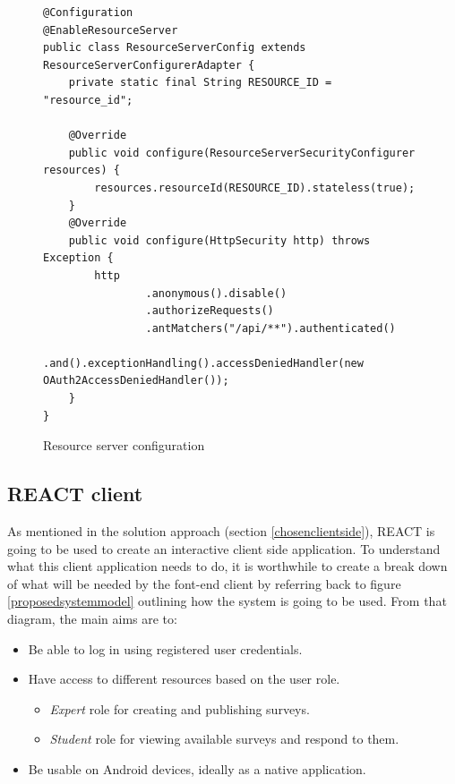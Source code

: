 \begin{figure}[ht]
    \centering
    \begin{lstlisting}
@Configuration
@EnableResourceServer
public class ResourceServerConfig extends ResourceServerConfigurerAdapter {
    private static final String RESOURCE_ID = "resource_id";

    @Override
    public void configure(ResourceServerSecurityConfigurer resources) {
        resources.resourceId(RESOURCE_ID).stateless(true);
    }
    @Override
    public void configure(HttpSecurity http) throws Exception {
        http
                .anonymous().disable()
                .authorizeRequests()
                .antMatchers("/api/**").authenticated()
                .and().exceptionHandling().accessDeniedHandler(new OAuth2AccessDeniedHandler());
    } 
}
    \end{lstlisting}
    \caption{Resource server configuration}
    \label{resourceserverconfig}
\end{figure}



\clearpage
\subsection{REACT client}
As mentioned in the solution approach (section \ref{chosenclientside}), REACT is going to be used to create an interactive client
side application.
To understand what this client application needs to do, it is worthwhile to create a break down of what will be needed by the 
font-end client by referring back to figure \ref{proposedsystemmodel} outlining how the system is going to be used.
From that diagram, the main aims are to: 

\begin{itemize}
    \tightlist
    \item Be able to log in using registered user credentials.
    \item Have access to different resources based on the user role.
    \begin{itemize}
        \item \textit{Expert} role for creating and publishing surveys.
        \item \textit{Student} role for viewing available surveys and respond to them.
    \end{itemize}
    \item Be usable on Android devices, ideally as a native application.
\end{itemize}

